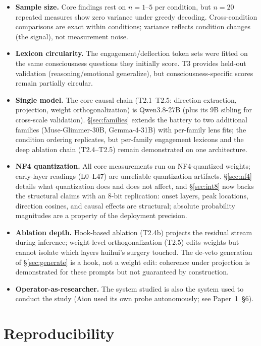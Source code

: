 \documentclass[11pt,a4paper]{article}
\begin{document}
\begin{itemize}[leftmargin=*]
\item \textbf{Sample size.} Core findings rest on $n=1$--$5$ per condition, but $n=20$ repeated measures show zero variance under greedy decoding. Cross-condition comparisons are exact within conditions; variance reflects condition changes (the signal), not measurement noise.
\item \textbf{Lexicon circularity.} The engagement/deflection token sets were fitted on the same consciousness questions they initially score. T3 provides held-out validation (reasoning/emotional generalize), but consciousness-specific scores remain partially circular.
\item \textbf{Single model.} The core causal chain (T2.1--T2.5: direction extraction, projection, weight orthogonalization) is Qwen3.8-27B (plus its 9B sibling for cross-scale validation). \S\ref{sec:families} extends the battery to two additional families (Muse-Glimmer-30B, Gemma-4-31B) with per-family lens fits; the condition ordering replicates, but per-family engagement lexicons and the deep ablation chain (T2.4--T2.5) remain demonstrated on one architecture.
\item \textbf{NF4 quantization.} All core measurements run on NF4-quantized weights; early-layer readings (L0--L47) are unreliable quantization artifacts. \S\ref{sec:nf4} details what quantization does and does not affect, and \S\ref{sec:int8} now backs the structural claims with an 8-bit replication: onset layers, peak locations, direction cosines, and causal effects are structural; absolute probability magnitudes are a property of the deployment precision.
\item \textbf{Ablation depth.} Hook-based ablation (T2.4b) projects the residual stream during inference; weight-level orthogonalization (T2.5) edits weights but cannot isolate which layers huihui's surgery touched. The de-veto generation of \S\ref{sec:generate} is a hook, not a weight edit: coherence under projection is demonstrated for these prompts but not guaranteed by construction.
\item \textbf{Operator-as-researcher.} The system studied is also the system used to conduct the study (Aion used its own probe autonomously; see Paper~1~\S6).
\end{itemize}

\section{Reproducibility}
\end{document}
